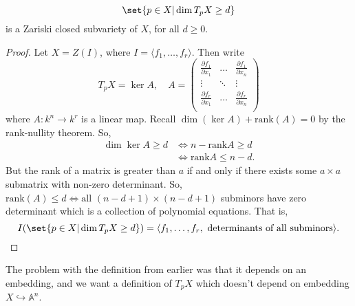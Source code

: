\documentclass{article}
\newcommand{\A}{\mathbb{A}}
\DeclareMathOperator{\Der}{Der}
\begin{document}
\begin{lemma}
    \begin{equation*}
        \set{p \in X | \dim T_p X \geq d}
    \end{equation*}
    is a Zariski closed subvariety of $X$, for all $d \geq 0$.
\end{lemma}
\begin{proof}
    Let $X = Z(I)$, where $I = \langle f_1, \dotsc, f_r \rangle$. Then write
    \begin{equation*}
        T_p X = \ker A, \quad
        A =
        \begin{pmatrix}
            \frac{\partial f_1}{\partial x_1} & \dots & \frac{\partial f_1}{\partial x_n} \\
            \vdots & \ddots & \vdots \\
            \frac{\partial f_r}{\partial x_1} & \dots & \frac{\partial f_r}{\partial x_n} \\
        \end{pmatrix}
    \end{equation*}
    where $A: k^n \to k^r$ is a linear map.
    Recall $\dim(\ker A) + \text{rank}(A) = 0$ by the rank-nullity theorem.  So,
    \begin{align*}
        \dim \ker A \geq d &\iff n - \text{rank} A \geq d \\&\iff \text{rank} A \leq n - d.
    \end{align*}
    But the rank of a matrix is greater than $a$ if and only if there exists some $a \times a$ submatrix with non-zero determinant.
    So, $\text{rank}(A) \leq d \Leftrightarrow \text{all } (n - d + 1) \times (n - d + 1)$ subminors have zero determinant which is a collection of polynomial equations.
    That is,
    \begin{equation*}I (\set{p \in X | \dim T_p X \geq d}) = \langle f_1, \dotsc, f_r, \text{ determinants of all subminors} \rangle.\end{equation*}
\end{proof}
The problem with the definition from earlier was that it depends on an embedding, and we want a definition of $T_p X$ which doesn't depend on embedding $X \hookrightarrow \A^n$.
\end{document}
